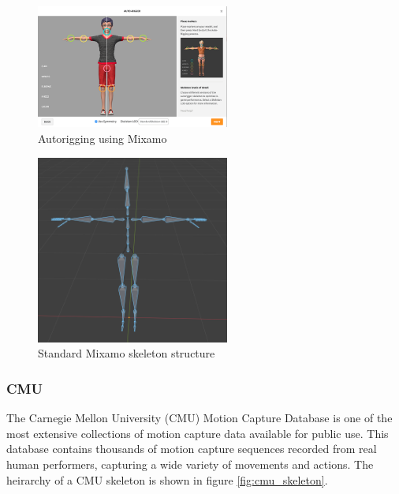\begin{figure}
  \centering \includegraphics[width = 2.5in]{images/background_work/mixamo_autorigging.png}
  \caption{Autorigging using Mixamo}
  \label{fig:mixamo_autorigging}
\end{figure}

\begin{figure}
  \centering \includegraphics[width = 2.5in]{images/background_work/mixamo_skeleton.png}
  \caption{Standard Mixamo skeleton structure}
  \label{fig:mixamo_skeleton}
\end{figure}

\subsubsection{CMU}

The Carnegie Mellon University (CMU) Motion Capture Database is one of the most extensive collections of motion capture data available for public use. This database contains thousands of motion capture sequences recorded from real human performers, capturing a wide variety of movements and actions. The heirarchy of a CMU skeleton is shown in figure \ref{fig:cmu_skeleton}.

